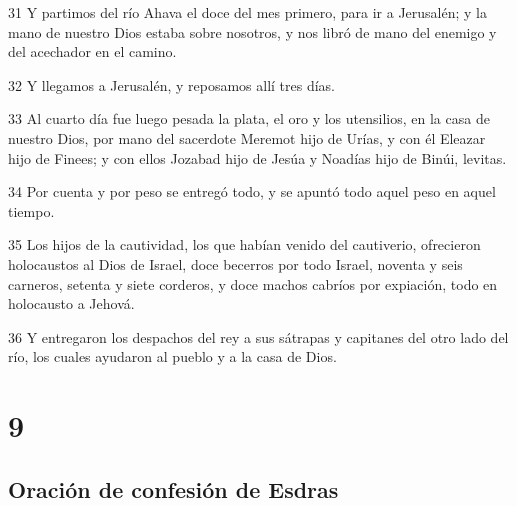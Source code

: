 \par 31 Y partimos del río Ahava el doce del mes primero, para ir a Jerusalén; y la mano de nuestro Dios estaba sobre nosotros, y nos libró de mano del enemigo y del acechador en el camino.
\par 32 Y llegamos a Jerusalén, y reposamos allí tres días.
\par 33 Al cuarto día fue luego pesada la plata, el oro y los utensilios, en la casa de nuestro Dios, por mano del sacerdote Meremot hijo de Urías, y con él Eleazar hijo de Finees; y con ellos Jozabad hijo de Jesúa y Noadías hijo de Binúi, levitas.
\par 34 Por cuenta y por peso se entregó todo, y se apuntó todo aquel peso en aquel tiempo.
\par 35 Los hijos de la cautividad, los que habían venido del cautiverio, ofrecieron holocaustos al Dios de Israel, doce becerros por todo Israel, noventa y seis carneros, setenta y siete corderos, y doce machos cabríos por expiación, todo en holocausto a Jehová.
\par 36 Y entregaron los despachos del rey a sus sátrapas y capitanes del otro lado del río, los cuales ayudaron al pueblo y a la casa de Dios.

\chapter{9}

\section*{Oración de confesión de Esdras}

